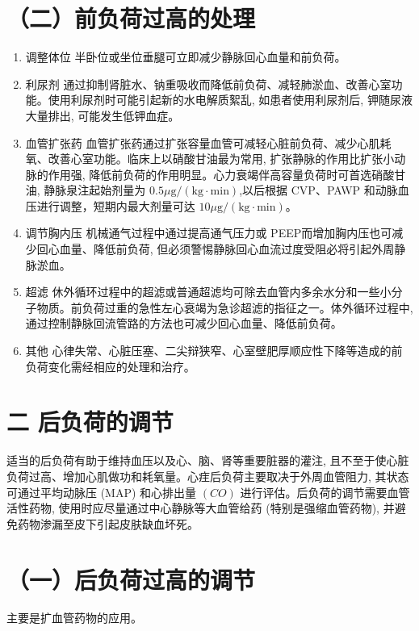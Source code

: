 \documentclass[10pt]{article}
\begin{document}
\section*{（二）前负荷过高的处理}
\begin{enumerate}
  \item 调整体位 半卧位或坐位垂腿可立即减少静脉回心血量和前负荷。

  \item 利尿剂 通过抑制肾脏水、钠重吸收而降低前负荷、减轻肺淤血、改善心室功能。使用利尿剂时可能引起新的水电解质絮乱, 如患者使用利尿剂后, 钾随尿液大量排出, 可能发生低钾血症。

  \item 血管扩张药 血管扩张药通过扩张容量血管可减轻心脏前负荷、减少心肌耗氧、改善心室功能。临床上以硝酸甘油最为常用, 扩张静脉的作用比扩张小动脉的作用强, 降低前负荷的作用明显。心力衰竭伴高容量负荷时可首选硝酸甘油, 静脉泉注起始剂量为 $0.5 \mu \mathrm{g} /(\mathrm{kg} \cdot \mathrm{min})$,以后根据 CVP、PAWP 和动脉血压进行调整，短期内最大剂量可达 $10 \mu \mathrm{g} /(\mathrm{kg} \cdot \mathrm{min}) 。$

  \item 调节胸内压 机械通气过程中通过提高通气压力或 PEEP而增加胸内压也可减少回心血量、降低前负荷, 但必须警惕静脉回心血流过度受阻必将引起外周静脉淤血。

  \item 超滤 休外循环过程中的超滤或普通超滤均可除去血管内多余水分和一些小分子物质。前负荷过重的急性左心衰竭为急诊超滤的指征之一。体外循环过程中, 通过控制静脉回流管路的方法也可减少回心血量、降低前负荷。

  \item 其他 心律失常、心脏压塞、二尖辩狭窄、心室壁肥厚顺应性下降等造成的前负荷变化需经相应的处理和治疗。

\end{enumerate}

\section*{二 后负荷的调节}
适当的后负荷有助于维持血压以及心、脑、肾等重要脏器的灌注, 且不至于使心脏负荷过高、增加心肌做功和耗氧量。心疰后负荷主要取决于外周血管阻力, 其状态可通过平均动脉压 (MAP) 和心排出量 $(C O)$ 进行评估。后负荷的调节需要血管活性药物, 使用时应尽量通过中心静脉等大血管给药 (特别是强缩血管药物), 并避免药物渗漏至皮下引起皮肤缺血坏死。

\section*{（一）后负荷过高的调节}
主要是扩血管药物的应用。
\end{document}
